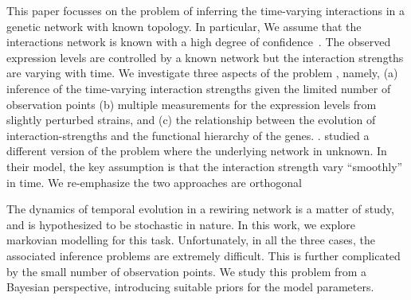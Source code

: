 \documentclass{bioinfo}
\begin{document}

This paper focusses on the problem of inferring the time-varying
interactions in a genetic network with known topology. In particular, We assume that the
interactions network is known with a high degree of 
confidence~.  The observed expression levels are
controlled by a known network but  the interaction strengths are
varying with time. We investigate three aspects of the problem
, namely, (a) inference of the time-varying interaction strengths given the limited number of
observation points (b) multiple measurements for the expression
levels from slightly perturbed strains, and (c) the relationship between the evolution of
interaction-strengths and the functional hierarchy of the
genes. .  \cite{Song09KELLER} studied a different version
of the problem where the underlying network in unknown. In their
model, the key  assumption is that the interaction strength vary
``smoothly'' in time. We re-emphasize the two approaches are
orthogonal 

The dynamics of temporal evolution in a rewiring
network is a matter of study, and is hypothesized to be stochastic in
nature. In this work, we explore markovian modelling for this
task. Unfortunately, in all the three cases, the associated inference
problems are extremely difficult. This is further complicated by the
small number of observation points. We study this problem from a
Bayesian perspective, introducing suitable priors for the model
parameters. 

\end{document}
